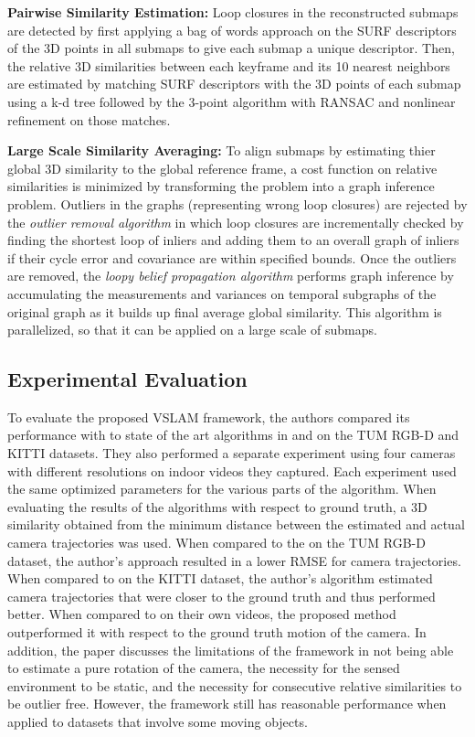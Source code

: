 \documentclass[10pt,twocolumn,letterpaper]{article}
\begin{document}
\textbf{Pairwise Similarity Estimation:} Loop closures in the reconstructed submaps are 
detected by first applying a bag of words approach on the SURF descriptors of the 3D 
points in all submaps to give each submap a unique descriptor. Then, the relative 
3D similarities between each keyframe and its 10 nearest neighbors are estimated by 
matching SURF descriptors with the 3D points of each submap using a k-d tree followed by the
 3-point algorithm \cite{17} with RANSAC and nonlinear refinement on 
those matches.

\textbf{Large Scale Similarity Averaging:} To align submaps by 
estimating thier global 3D similarity to the global reference frame, a cost function on relative 
similarities is minimized by transforming the problem into a graph inference problem. 
Outliers in the graphs (representing wrong loop closures) are rejected by the 
\textit{outlier removal algorithm} \cite{Bourmaud_2015_CVPR} in which loop closures are incrementally checked 
by finding the shortest loop of inliers and adding them to an overall graph of inliers 
if their cycle error and covariance are within specified bounds. 
Once the outliers are removed, the \textit{loopy belief propagation algorithm} 
\cite{Bourmaud_2015_CVPR} performs 
graph inference by accumulating the measurements and variances on temporal 
subgraphs of the original graph as it builds up final average global similarity. 
This algorithm is parallelized, so that it can be applied on a large scale of submaps.

\subsection{Experimental Evaluation}
To evaluate the proposed VSLAM framework, the authors compared its performance 
with to state of the art algorithms in \cite{10} and \cite{12} on the TUM RGB-D \cite{29} 
and KITTI \cite{mv31} datasets. They also performed a separate experiment using four cameras with different resolutions on indoor videos they captured. 
Each experiment used the same optimized parameters for the various parts of the algorithm. 
When evaluating the results of the algorithms with respect to ground truth, a 3D similarity 
obtained from the minimum distance between the estimated and actual camera trajectories 
was used. When compared to the \cite{10} on the TUM RGB-D dataset, the author's approach 
resulted in a 
lower RMSE for camera trajectories. 
When compared to \cite{12} on the KITTI dataset, 
the author's algorithm estimated camera trajectories that were closer to the ground truth and 
thus performed better. When compared to \cite{10} on their own videos, the proposed 
method outperformed it with respect to the ground truth motion of the camera. 
In addition, the paper discusses the limitations of the framework in not being able to 
estimate a pure rotation of the camera, the necessity for the sensed environment 
to be static, and the necessity for consecutive relative similarities to be outlier free. 
However, the framework still has reasonable performance when applied to datasets 
that involve some moving objects.
\end{document}
